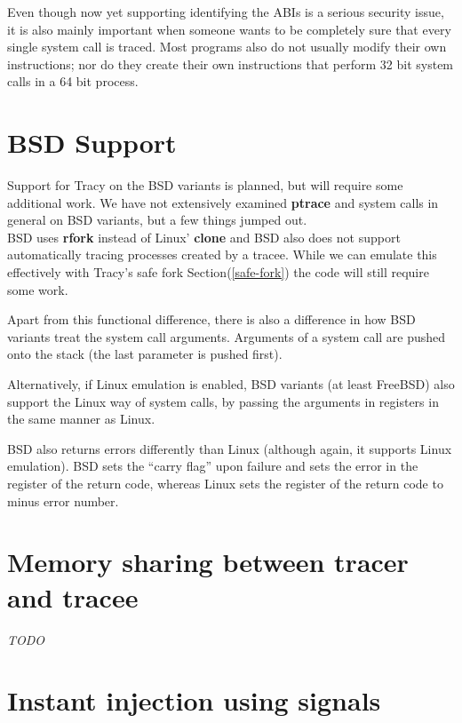 \documentclass[a4paper, 10pt]{report}
\begin{document}
Even though now yet supporting identifying the ABIs is a serious security issue,
it is also mainly important when someone wants to be completely sure that every
single system call is traced. Most programs also do not usually modify their
own instructions; nor do they create their own instructions
that perform 32 bit system calls in a 64 bit process.

\section{BSD Support}

Support for Tracy on the BSD variants is planned, but will require some
additional work. We have not extensively examined \textbf{ptrace} and
system calls in general on BSD variants, but a few things jumped out. \\

BSD uses \textbf{rfork} instead of Linux' \textbf{clone} and BSD also does
not support automatically tracing processes created by a tracee. While
we can emulate this effectively with Tracy's safe fork
Section(\ref{safe-fork}) the code will still require some work.

Apart from this functional difference, there is also a difference in
how BSD variants treat the system call arguments. Arguments of a system
call are pushed onto the stack (the last parameter is pushed first).
\cite{int80h}

Alternatively, if Linux emulation is enabled, BSD variants (at least FreeBSD)
also support the Linux way of system calls, by passing the arguments in
registers in the same manner as Linux.

BSD also returns errors differently than Linux (although again, it supports
Linux emulation). BSD sets the ``carry flag'' upon failure and sets the error
in the register of the return code, whereas Linux sets the register of the
return code to minus error number.

\section{Memory sharing between tracer and tracee}
\label{memory-share}

\textit{TODO}

\section{Instant injection using signals}
\label{instant-inject}
\end{document}
